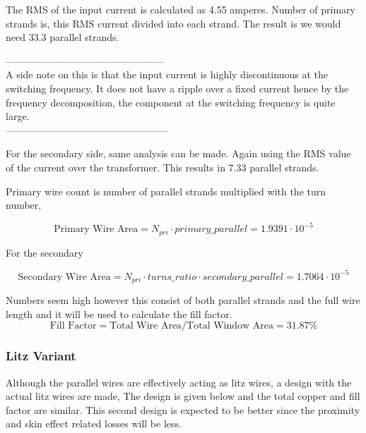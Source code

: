 \documentclass[12pt]{article}
\begin{document}
    The RMS of the input current is calculated as 4.55 amperes.
    Number of primary strands is, this RMS current divided into each strand. The result is we would need 33.3 parallel strands.

    \begin{center}
    ------------------------------------------------ \\
    A side note on this is that the input current is highly discontinuous at the switching frequency. It does not have a ripple over a fixed current hence by the frequency decomposition, the component at the switching frequency is quite large. \\
    -------------------------------------------------- \\
    \end{center}
    
    For the secondary side, same analysis can be made. Again using the RMS value of the current over the transformer. This results in 7.33 parallel strands.

    Primary wire count is number of parallel strands multiplied with the turn number,

    \begin{equation*}
        \textrm{Primary Wire Area} = N_{pri} \cdot primary\_parallel = 1.9391\cdot 10^{-5}
    \end{equation*}

    For the secondary

    \begin{equation*}
        \textrm{Secondary Wire Area} = N_{pri} \cdot turns\_ratio \cdot secondary\_parallel = 1.7064\cdot 10^{-5}
    \end{equation*}

    Numbers seem high however this consist of both parallel strands and the full wire length and it will be used to calculate the fill factor.
    \begin{equation*}
        \textrm{Fill Factor} = \textrm{Total Wire Area} / \textrm{Total Window Area} =   31.87 \%
    \end{equation*}

    \subsubsection{Litz Variant}

    Although the parallel wires are effectively acting as litz wires, a design with the actual litz wires are made, The design is given below and the total copper and fill factor are similar. This second design is expected to be better since the proximity and skin effect related losses will be less.
\end{document}
